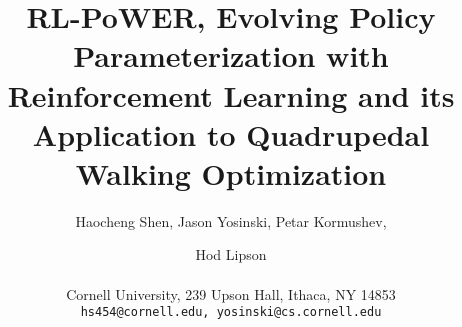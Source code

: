 \documentclass[letterpaper]{article}
\title{RL-PoWER, Evolving Policy Parameterization with Reinforcement Learning and its Application to Quadrupedal Walking Optimization}
\author{Haocheng Shen, Jason Yosinski, Petar Kormushev, \and Hod Lipson  \\
  \mbox{}\\
Cornell University, 239 Upson Hall, Ithaca, NY 14853 \\
\texttt{hs454@cornell.edu, yosinski@cs.cornell.edu}}
\begin{document}
\maketitle


\begin{abstract}

\end{abstract}
























\footnotesize


\end{document}
